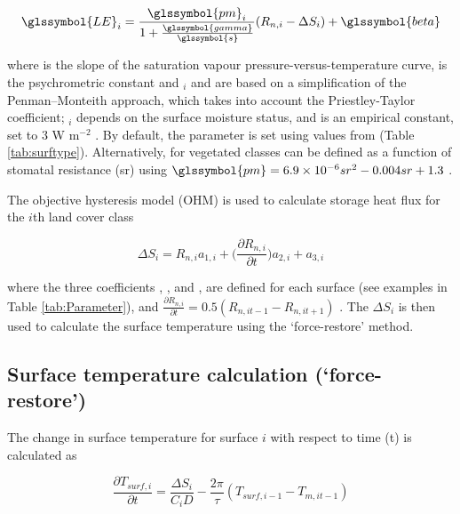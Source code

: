 \documentclass[final,3p,times,authoryear]{elsarticle}
\begin{document}
\begin{equation} 
\glssymbol{LE}_{i} = 
\frac{\glssymbol{pm}_{i}}{1+\frac{\glssymbol{gamma}}{\glssymbol{s}}}
(R_{n,i}-\Delta S_{i})+ \glssymbol{beta}
\label{eq:LE} \end{equation} 

where  is the slope of the saturation vapour pressure-versus-temperature curve,  is the psychrometric constant and $_{i}$ and  are based on a simplification of the Penman–Monteith approach, which takes into account the Priestley-Taylor coefficient; $_{i}$ depends on the surface moisture status, and  is an empirical constant, set to 3 W m$^{-2}$ \citep{Grimmond2002a}. By default, the  parameter is set using values from \cite{Hanna1992} (Table \ref{tab:surftype}). Alternatively,  for vegetated classes can be defined as a function of stomatal resistance (sr) using $\glssymbol{pm} = 6.9\times10^{-6} sr^{2} - 0.004 sr + 1.3$ \citep{DeBruin1983}.  

The objective hysteresis model (OHM) is used to calculate storage heat flux for the $i$th land cover class  \citep{Grimmond2002a} 

\begin{equation} 
\Delta S_{i} = R_{n,i} a_{1,i} + \Big( \frac{\partial R_{n,i}}{\partial t}   \Big)a_{2,i} + a_{3,i}
\label{eq:ohm} \end{equation} 


where the three coefficients , , and , are defined for each surface (see examples in Table \ref{tab:Parameter}), and $\frac{\partial R_{n,i}}{\partial t} =0.5(R_{n,it-1} - R_{n,it+1})$  .  The $\Delta S_{i}$ is then used to calculate the surface temperature using the `force-restore' method.


\subsection{Surface temperature calculation (`force-restore')}\label{sec:tsurf}

The change in surface temperature  for surface $i$ with respect to time (t) is calculated as

\begin{equation} 
\frac{\partial T_{surf,i}}{\partial t}= \frac{\Delta S_{i}}{C_{i} D} - \frac{2 \pi}{\tau} (T_{surf,i -1} - T_{m,it-1})
\label{eq:force} \end{equation} 
\end{document}
